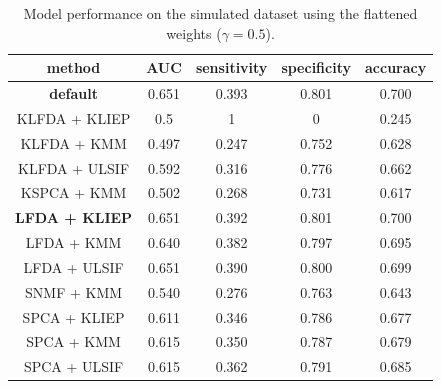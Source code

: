 \documentclass[a4paper,12pt]{article}
\begin{document}
\begin{table}[H]
	\centering
\begin{tabular} {c | c | c | c | c }
method & AUC& sensitivity & specificity & accuracy  \\
\hline \hline
 \textbf{default} & 0.651 & 0.393 & 0.801 & 0.700 \\
 KLFDA + KLIEP& 0.5 & 1 & 0 & 0.245 \\
 KLFDA + KMM & 0.497 & 0.247 & 0.752 & 0.628 \\
 KLFDA + ULSIF& 0.592 & 0.316 & 0.776 & 0.662  \\
 KSPCA + KMM & 0.502 & 0.268 & 0.731 & 0.617 \\
 \textbf{LFDA + KLIEP} & 0.651 & 0.392 & 0.801 & 0.700  \\
 LFDA + KMM & 0.640 & 0.382 & 0.797 & 0.695 \\
 LFDA + ULSIF & 0.651 & 0.390 & 0.800 & 0.699 \\
 SNMF + KMM & 0.540 & 0.276 & 0.763 & 0.643 \\
 SPCA + KLIEP & 0.611 & 0.346 & 0.786 & 0.677 \\
 SPCA + KMM & 0.615 & 0.350 & 0.787 & 0.679 \\
 SPCA + ULSIF & 0.615 & 0.362 & 0.791 & 0.685 \\
\hline \hline
\end{tabular}	
\caption{Model performance on the simulated dataset using the flattened weights ($\gamma = 0.5$).}
\label{simulated data res flat}
\end{table}
\end{document}
